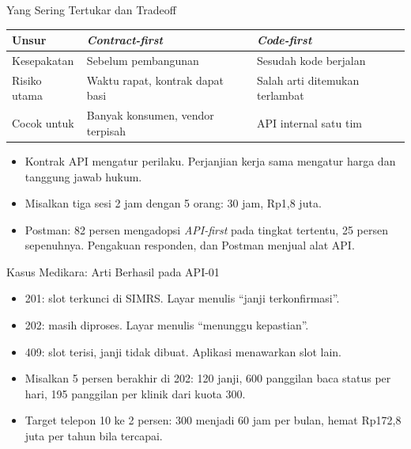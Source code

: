 \documentclass[aspectratio=169, table, 12pt]{beamer}
\begin{document}
\begin{frame}{{\Large Yang Sering Tertukar dan Tradeoff}}
  \footnotesize
  \begin{tabularx}{\textwidth}{>{\raggedright\arraybackslash}p{2.4cm} >{\raggedright\arraybackslash}X >{\raggedright\arraybackslash}X}
    \hline
    \textbf{Unsur} & \textbf{\textit{Contract-first}} & \textbf{\textit{Code-first}} \\ \hline
    Kesepakatan & Sebelum pembangunan & Sesudah kode berjalan \\ \hline
    Risiko utama & Waktu rapat, kontrak dapat basi & Salah arti ditemukan terlambat \\ \hline
    Cocok untuk & Banyak konsumen, vendor terpisah & API internal satu tim \\ \hline
  \end{tabularx}

  \vspace{8pt}
  \small
  \begin{itemize}
    \item Kontrak API mengatur perilaku. Perjanjian kerja sama mengatur harga dan tanggung jawab hukum.
    \item Misalkan tiga sesi 2 jam dengan 5 orang: 30 jam, Rp1,8 juta.
    \item Postman: 82 persen mengadopsi \textit{API-first} pada tingkat tertentu, 25 persen sepenuhnya. Pengakuan responden, dan Postman menjual alat API.
  \end{itemize}
\end{frame}

\begin{frame}{{\Large Kasus Medikara: Arti Berhasil pada API-01}}
  \vspace{8pt}
  \begin{itemize}
    \item 201: slot terkunci di SIMRS. Layar menulis ``janji terkonfirmasi''.
    \item 202: masih diproses. Layar menulis ``menunggu kepastian''.
    \item 409: slot terisi, janji tidak dibuat. Aplikasi menawarkan slot lain.
    \item Misalkan 5 persen berakhir di 202: 120 janji, 600 panggilan baca status per hari, 195 panggilan per klinik dari kuota 300.
    \item Target telepon 10 ke 2 persen: 300 menjadi 60 jam per bulan, hemat Rp172,8 juta per tahun bila tercapai.
  \end{itemize}
\end{frame}
\end{document}
